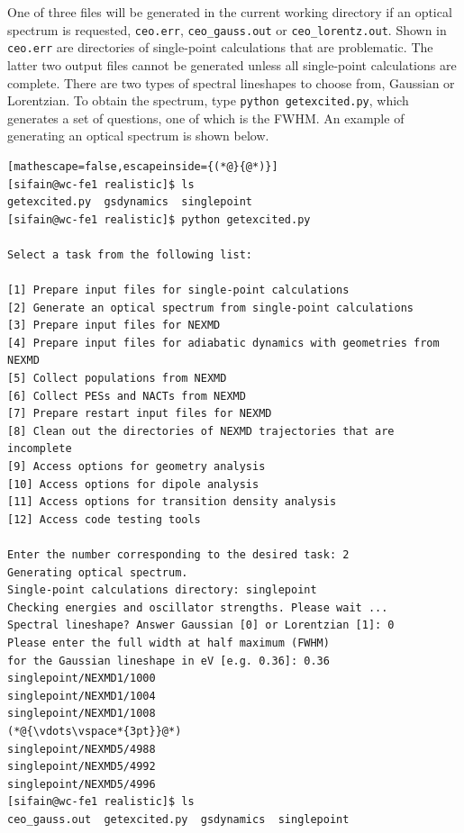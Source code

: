 \documentclass[letterpaper,12pt,titlepage]{article}
\begin{document}
One of three files will be generated in the current working directory if an optical spectrum is requested, \verb+ceo.err+, \verb+ceo_gauss.out+ or \verb+ceo_lorentz.out+.  Shown in \verb+ceo.err+ are directories of single-point calculations that are problematic.  The latter two output files cannot be generated unless all single-point calculations are complete.  There are two types of spectral lineshapes to choose from, Gaussian or Lorentzian.  To obtain the spectrum, type \verb+python getexcited.py+, which generates a set of questions, one of which is the FWHM.  An example of generating an optical spectrum is shown below.
\newline
\begin{lstlisting}[mathescape=false,escapeinside={(*@}{@*)}]
[sifain@wc-fe1 realistic]$ ls
getexcited.py  gsdynamics  singlepoint
[sifain@wc-fe1 realistic]$ python getexcited.py 

Select a task from the following list:

[1] Prepare input files for single-point calculations
[2] Generate an optical spectrum from single-point calculations
[3] Prepare input files for NEXMD
[4] Prepare input files for adiabatic dynamics with geometries from NEXMD
[5] Collect populations from NEXMD
[6] Collect PESs and NACTs from NEXMD
[7] Prepare restart input files for NEXMD
[8] Clean out the directories of NEXMD trajectories that are incomplete
[9] Access options for geometry analysis
[10] Access options for dipole analysis
[11] Access options for transition density analysis
[12] Access code testing tools

Enter the number corresponding to the desired task: 2
Generating optical spectrum.
Single-point calculations directory: singlepoint
Checking energies and oscillator strengths. Please wait ...
Spectral lineshape? Answer Gaussian [0] or Lorentzian [1]: 0
Please enter the full width at half maximum (FWHM) 
for the Gaussian lineshape in eV [e.g. 0.36]: 0.36
singlepoint/NEXMD1/1000
singlepoint/NEXMD1/1004
singlepoint/NEXMD1/1008
(*@{\vdots\vspace*{3pt}}@*)
singlepoint/NEXMD5/4988
singlepoint/NEXMD5/4992
singlepoint/NEXMD5/4996
[sifain@wc-fe1 realistic]$ ls
ceo_gauss.out  getexcited.py  gsdynamics  singlepoint
\end{lstlisting}
\end{document}
